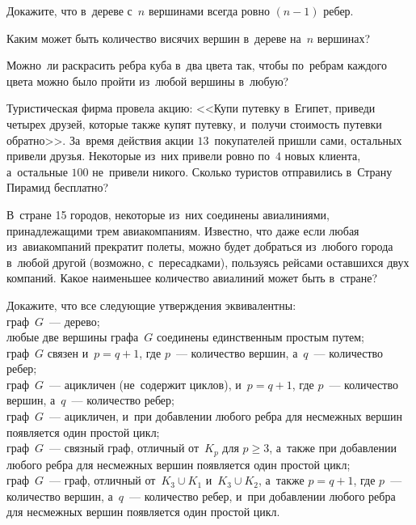 \begin{problems}

\item
Докажите, что в~дереве с~$n$ вершинами всегда ровно $(n - 1)$ ребер.

\item
Каким может быть количество висячих вершин в~дереве на~$n$ вершинах?

\item
Можно~ли раскрасить ребра куба в~два цвета так, чтобы по~ребрам каждого цвета
можно было пройти из~любой вершины в~любую?

\item
Туристическая фирма провела акцию:
<<Купи путевку в~Египет, приведи четырех друзей, которые также купят путевку,
и~получи стоимость путевки обратно>>.
За~время действия акции $13$~покупателей пришли сами, остальных привели друзья.
Некоторые из~них привели ровно по~$4$ новых клиента, а~остальные $100$
не~привели никого.
Сколько туристов отправились в~Страну Пирамид бесплатно?

\item
В~стране 15 городов, некоторые из~них соединены авиалиниями, принадлежащими
трем авиакомпаниям.
Известно, что даже если любая из~авиакомпаний прекратит полеты, можно будет
добраться из~любого города в~любой другой (возможно, с~пересадками), пользуясь
рейсами оставшихся двух компаний.
Какое наименьшее количество авиалиний может быть в~стране?

\item
Докажите, что все следующие утверждения эквивалентны:
\\
граф~$G$~--- дерево;
\\
любые две вершины графа~$G$ соединены единственным простым путем;
\\
граф~$G$ связен и~$p = q + 1$, где $p$~--- количество вершин, а~$q$~---
количество ребер;
\\
граф~$G$~--- ацикличен (не~содержит циклов), и~$p = q + 1$, где $p$~---
количество вершин, а~$q$~--- количество ребер;
\\
граф~$G$~--- ацикличен, и~при добавлении любого ребра для несмежных вершин
появляется один простой цикл;
\\
граф~$G$~--- связный граф, отличный от~$K_p$ для $p \geq 3$, а~также при
добавлении любого ребра для несмежных вершин появляется один простой цикл;
\\
граф~$G$~--- граф, отличный от~$K_3 \cup K_1$ и~$K_3 \cup K_2$,
а~также $p = q + 1$, где $p$~--- количество вершин, а~$q$~--- количество ребер,
и~при добавлении любого ребра для несмежных вершин появляется один простой
цикл.

\end{problems}

